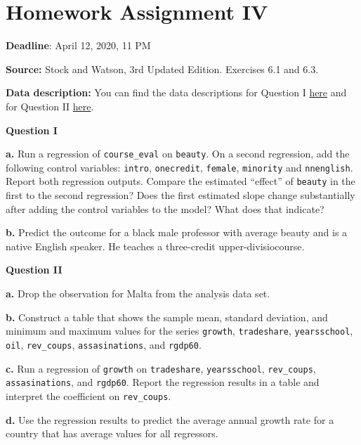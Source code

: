 \documentclass[
]{book}
\begin{document}
\hypertarget{homework-assignment-iv}{%
\chapter{Homework Assignment IV}\label{homework-assignment-iv}}

\textbf{Deadline}: April 12, 2020, 11 PM

\textbf{Source:} Stock and Watson, 3rd Updated Edition. Exercises 6.1 and 6.3.

\textbf{Data description:} You can find the data descriptions for Question I \href{https://wps.pearsoned.com/wps/media/objects/11422/11696965/empirical/empex_tb/TeachingRatings_Description.pdf}{here} and for Question II \href{https://wps.pearsoned.com/wps/media/objects/11422/11696965/empirical/empex_tb/Growth_Description.pdf}{here}.

\textbf{Question I}

\textbf{a.} Run a regression of \texttt{course\_eval} on \texttt{beauty}. On a second regression, add the following control variables: \texttt{intro}, \texttt{onecredit}, \texttt{female}, \texttt{minority} and \texttt{nnenglish}. Report both regression outputs. Compare the estimated ``effect'' of \texttt{beauty} in the first to the second regression? Does the first estimated slope change substantially after adding the control variables to the model? What does that indicate?

\textbf{b.} Predict the outcome for a black male professor with average beauty and is a native English speaker. He teaches a three-credit upper-divisiocourse.

\textbf{Question II}

\textbf{a.} Drop the observation for Malta from the analysis data set.

\textbf{b.} Construct a table that shows the sample mean, standard deviation, and minimum and maximum values for the series \texttt{growth}, \texttt{tradeshare}, \texttt{yearsschool}, \texttt{oil}, \texttt{rev\_coups}, \texttt{assasinations}, and \texttt{rgdp60}.

\textbf{c.} Run a regression of \texttt{growth} on \texttt{tradeshare}, \texttt{yearsschool}, \texttt{rev\_coups}, \texttt{assasinations}, and \texttt{rgdp60}. Report the regression results in a table and interpret the coefficient on \texttt{rev\_coups}.

\textbf{d.} Use the regression results to predict the average annual growth rate for a country that has average values for all regressors.
\end{document}
